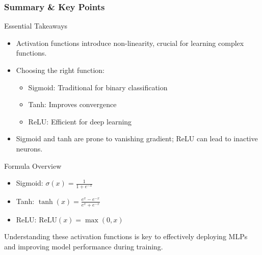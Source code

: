 \documentclass[aspectratio=169]{beamer}
\begin{document}
\begin{frame}[fragile]
    \frametitle{Summary \& Key Points}
    \begin{block}{Essential Takeaways}
        \begin{itemize}
            \item Activation functions introduce non-linearity, crucial for learning complex functions.
            \item Choosing the right function:
                \begin{itemize}
                    \item Sigmoid: Traditional for binary classification
                    \item Tanh: Improves convergence
                    \item ReLU: Efficient for deep learning
                \end{itemize}
            \item Sigmoid and tanh are prone to vanishing gradient; ReLU can lead to inactive neurons.
        \end{itemize}
    \end{block}
    
    \begin{block}{Formula Overview}
        \begin{itemize}
            \item Sigmoid: \( \sigma(x) = \frac{1}{1 + e^{-x}} \)
            \item Tanh: \( \tanh(x) = \frac{e^{x} - e^{-x}}{e^{x} + e^{-x}} \)
            \item ReLU: \( \text{ReLU}(x) = \max(0, x) \)
        \end{itemize}
    \end{block}
    
    Understanding these activation functions is key to effectively deploying MLPs and improving model performance during training.
\end{frame}
\end{document}
